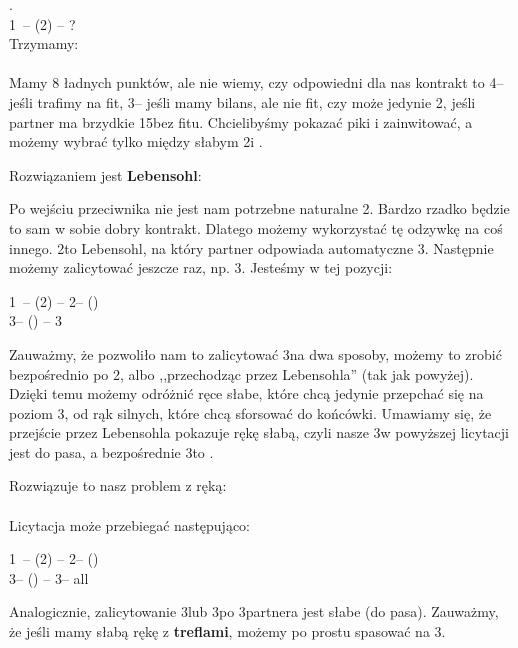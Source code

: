\documentclass[12pt, a4paper]{article}
\begin{document}
\vspace{0.3cm}
.\\
1\nt\ -- (2\hearts) -- ?\\
Trzymamy:\\
\\
Mamy 8 ładnych punktów, ale nie wiemy, czy odpowiedni dla nas kontrakt to
4\spades -- jeśli trafimy na fit, 3\nt -- jeśli mamy bilans, ale nie fit, czy może jedynie 2\spades,
jeśli partner ma brzydkie 15\hcp bez fitu. Chcielibyśmy pokazać piki i zainwitować, 
a możemy wybrać tylko między słabym 2\spades i \spades.

\vspace{0.5cm}
\noindent
Rozwiązaniem jest 
\textbf{{\color{red}L}{\color{orange}e}{\color{LimeGreen}b}{\color{cyan}e}{\color{blue}n}{\color{purple}s}{\color{red}o}{\color{orange}h}{\color{LimeGreen}l}}:


Po wejściu przeciwnika nie jest nam potrzebne naturalne 2\nt. Bardzo rzadko będzie to 
sam w sobie dobry kontrakt. Dlatego możemy wykorzystać tę odzywkę na coś innego.
2\nt to Lebensohl, na który partner odpowiada automatyczne 3\clubs. Następnie możemy zalicytować
jeszcze raz, np. 3\hearts. Jesteśmy w tej pozycji:

    1\nt\ -- (2\spades) -- 2\nt -- (\pass)\\
    3\clubs -- (\pass) -- 3\hearts

Zauważmy, że pozwoliło nam to zalicytować 3\hearts na dwa sposoby, możemy to zrobić bezpośrednio
po 2\spades,
albo ,,przechodząc przez Lebensohla'' (tak jak powyżej). Dzięki temu możemy odróżnić ręce słabe,
które chcą jedynie przepchać się na poziom 3, od rąk silnych, które chcą sforsować do końcówki.
Umawiamy się, że przejście przez Lebensohla pokazuje rękę słabą, czyli nasze 3\hearts w powyższej licytacji
jest do pasa, a bezpośrednie 3\hearts to \gf.

Rozwiązuje to nasz problem z ręką:\\
\\
Licytacja może przebiegać następująco:

1\nt\ -- (2\spades) -- 2\nt -- (\pass)\\
3\clubs -- (\pass) -- 3\hearts -- all \pass

Analogicznie, zalicytowanie 3\spades lub 3\diams po 3\clubs partnera jest słabe (do pasa).
Zauważmy, że jeśli mamy słabą rękę z \textbf{treflami}, możemy po prostu spasować na 3\clubs.
\end{document}
